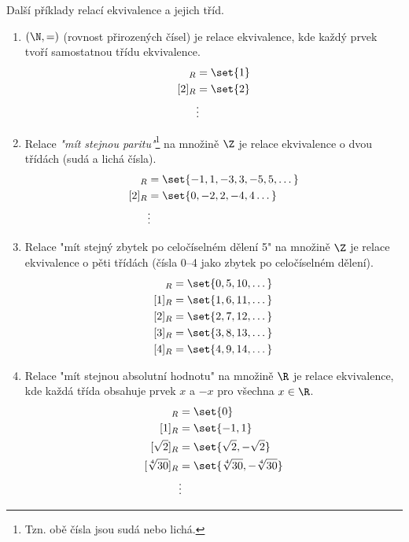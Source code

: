 \begin{example}
    Další příklady relací ekvivalence a jejich tříd.
    \begin{enumerate}[label=(\roman*)]
        \item $(\N,=)$ (rovnost přirozených čísel) je relace ekvivalence, kde každý prvek tvoří samostatnou třídu ekvivalence.
        \begin{align*}
            [1]_R&=\set{1}\\
            [2]_R&=\set{2}\\
            &\vdots
        \end{align*}
        \item Relace \emph{"mít stejnou paritu"}\footnote{Tzn. obě čísla jsou sudá nebo lichá.} na množině $\Z$ je relace ekvivalence o dvou třídách (sudá a lichá čísla).
        \begin{align*}
            [1]_R&=\set{-1,1,-3,3,-5,5,\dots}\\
            [2]_R&=\set{0,-2,2,-4,4\dots}\\
            &\vdots
        \end{align*}
        \item Relace "mít stejný zbytek po celočíselném dělení 5" na množině $\Z$ je relace ekvivalence o pěti třídách (čísla 0--4 jako zbytek po celočíselném dělení).
        \begin{align*}
            [0]_R&=\set{0,5,10,\dots}\\
            [1]_R&=\set{1,6,11,\dots}\\
            [2]_R&=\set{2,7,12,\dots}\\
            [3]_R&=\set{3,8,13,\dots}\\
            [4]_R&=\set{4,9,14,\dots}
        \end{align*}
        \item Relace "mít stejnou absolutní hodnotu" na množině $\R$ je relace ekvivalence, kde každá třída obsahuje prvek $x$ a $-x$ pro všechna $x\in\R$.
        \begin{align*}
            [0]_R&=\set{0}\\
            [1]_R&=\set{-1,1}\\
            [\sqrt{2}]_R&=\set{\sqrt{2},-\sqrt{2}}\\
            [\sqrt[4]{30}]_R&=\set{\sqrt[4]{30},-\sqrt[4]{30}}\\
            &\vdots
        \end{align*}
    \end{enumerate}
\end{example}

